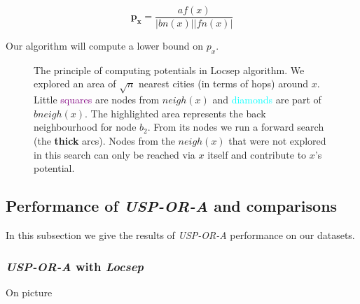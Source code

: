 		$$\bm{p_{x}} = \frac{af(x)}{|bn(x)||fn(x)|}$$
		
		\noindent Our algorithm will compute a lower bound on $p_{x}$.
		
		
		\begin{figure}[h!]
			\begin{center}
			\end{center}
			\caption{\label{fig:locsep} The principle of computing potentials in Locsep algorithm. We explored an area of $\sqrt{n}$ nearest cities (in terms of hops) around $x$. Little \textcolor{purple}{squares} are nodes from $neigh(x)$ and \textcolor{cyan}{diamonds} are part of $bneigh(x)$. The highlighted area represents the back neighbourhood for node $b_{2}$. From its nodes we run a forward search (the \textbf{thick} arcs). Nodes from the $neigh(x)$ that were not explored in this search can only be reached via $x$ itself and contribute to $x$'s potential.}
		\end{figure}
	
\subsection{Performance of \textit{USP-OR-A} and comparisons}

	\noindent In this subsection we give the results of \textit{USP-OR-A} performance on our datasets.

	\subsubsection{\textit{USP-OR-A} with \textit{Locsep}}
	
		\noindent On picture

		\begin{figure}[h!]
		\centering
		\end{figure}
		
